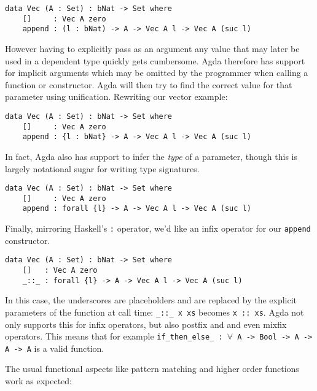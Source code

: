 \begin{lstlisting}[caption={A Simple Vector Type},label={lst:tutorial:vec}]
data Vec (A : Set) : bNat -> Set where
    []     : Vec A zero
    append : (l : bNat) -> A -> Vec A l -> Vec A (suc l)
\end{lstlisting}

However having to explicitly pass as an argument any value that may later be used in a dependent type quickly gets cumbersome. Agda therefore has support for implicit arguments which may be omitted by the programmer when calling a function or constructor. Agda will then try to find the correct value for that parameter using unification. Rewriting our vector example:

\begin{lstlisting}[caption={A Simple Vector Type, Take Two},label={lst:tutorial:vec:2}]
data Vec (A : Set) : bNat -> Set where
    []     : Vec A zero
    append : {l : bNat} -> A -> Vec A l -> Vec A (suc l)
\end{lstlisting}

In fact, Agda also has support to infer the \emph{type} of a parameter, though this is largely notational sugar for writing type signatures.

\begin{lstlisting}[caption={A Simple Vector Type, Take Three},label={lst:tutorial:vec:3}]
data Vec (A : Set) : bNat -> Set where
    []     : Vec A zero
    append : forall {l} -> A -> Vec A l -> Vec A (suc l)
\end{lstlisting}

Finally, mirroring Haskell's \texttt{:} operator, we'd like an infix operator for our \texttt{append} constructor.

\begin{lstlisting}[caption={A Simple Vector Type, Take Four},label={lst:tutorial:vec:4}]
data Vec (A : Set) : bNat -> Set where
    []   : Vec A zero
    _::_ : forall {l} -> A -> Vec A l -> Vec A (suc l)
\end{lstlisting}

In this case, the underscores are placeholders and are replaced by the explicit parameters of the function at call time: \texttt{\_::\_ x xs} becomes \texttt{x :: xs}. Agda not only supports this for infix operators, but also postfix and and even mixfix operators. This means that for example \texttt{if\_then\_else\_ : $\forall$ {A} -> Bool -> A -> A -> A} is a valid function.

The usual functional aspects like pattern matching and higher order functions work as expected:

